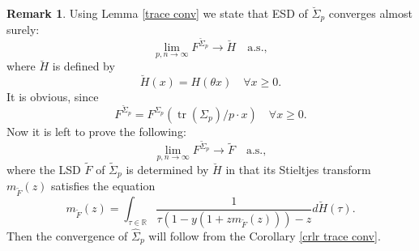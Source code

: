 \documentclass[a4paper,11pt]{article}
\theoremstyle{plain}
\theoremstyle{definition}
\newtheorem{rmrk}[thm]{Remark}
\newcommand{\MR}{\mathbb{R}}
\newcommand{\tr}{\operatorname{tr}}
\begin{document}
    \begin{rmrk} \label{Thm 2 expl}
    	Using Lemma \ref{trace conv} we state that ESD of $\breve{\Sigma}_p$ converges almost surely:
    	\[\lim_{p,n \rightarrow \infty} F^{\breve{\Sigma}_p} \rightarrow \breve{H} \quad \text{a.s.},\] 
    	where $\breve{H}$ is defined by
    	\[\breve{H}(x) = H(\theta x) \quad \forall x \geq 0. \]
    	It is obvious, since
    	\[ F^{\breve{\Sigma}_p} = F^{\Sigma_p}(\tr(\Sigma_p)/p \cdot x) \quad \forall x \geq 0. \]
    	Now it is left to prove the following:
    	\[\lim_{p,n \rightarrow \infty}   F^{\widetilde{\Sigma}_p} \rightarrow \widetilde{F} \quad \text{a.s.}, \]
    	where the LSD $\widetilde{F}$ of $\widetilde{\Sigma}_p$ is determined by $\breve{H}$ in that its Stieltjes transform $m_{\widetilde{F}}(z)$ satisfies the equation
    	\[ m_{\widetilde{F}}(z) = \int_{\tau \in \MR} \frac{1}{ \tau(1- y(1 + zm_{\widetilde{F}}(z))) - z } d\breve{H}(\tau). \]
    	Then the convergence of $\widehat{\Sigma}_p$ will follow from the Corollary \ref{crlr trace conv}.
    \end{rmrk}
    
\end{document}
